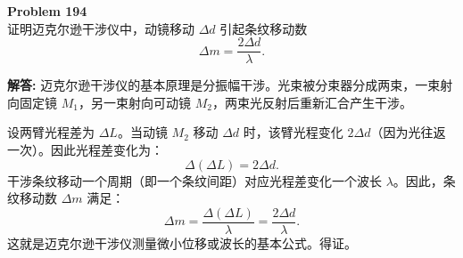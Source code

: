 \documentclass[12pt, a4paper, oneside]{ctexart}
\newenvironment{solution}{\par\noindent\textbf{解答:}\quad}{\par}
\begin{document}
\begin{mdframed}[backgroundcolor=gray!10, linewidth=0pt]
    \textbf{Problem 194} \\
    证明迈克尔逊干涉仪中，动镜移动 $\Delta d$ 引起条纹移动数
    \[
    \Delta m = \frac{2\Delta d}{\lambda}.
    \]
\end{mdframed}
\begin{solution}
    迈克尔逊干涉仪的基本原理是分振幅干涉。光束被分束器分成两束，一束射向固定镜 $M_1$，另一束射向可动镜 $M_2$，两束光反射后重新汇合产生干涉。

    设两臂光程差为 $\Delta L$。当动镜 $M_2$ 移动 $\Delta d$ 时，该臂光程变化 $2\Delta d$（因为光往返一次）。因此光程差变化为：
    \[
    \Delta (\Delta L) = 2\Delta d.
    \]
    干涉条纹移动一个周期（即一个条纹间距）对应光程差变化一个波长 $\lambda$。因此，条纹移动数 $\Delta m$ 满足：
    \[
    \Delta m = \frac{\Delta (\Delta L)}{\lambda} = \frac{2\Delta d}{\lambda}.
    \]
    这就是迈克尔逊干涉仪测量微小位移或波长的基本公式。得证。
\end{solution}
\end{document}
